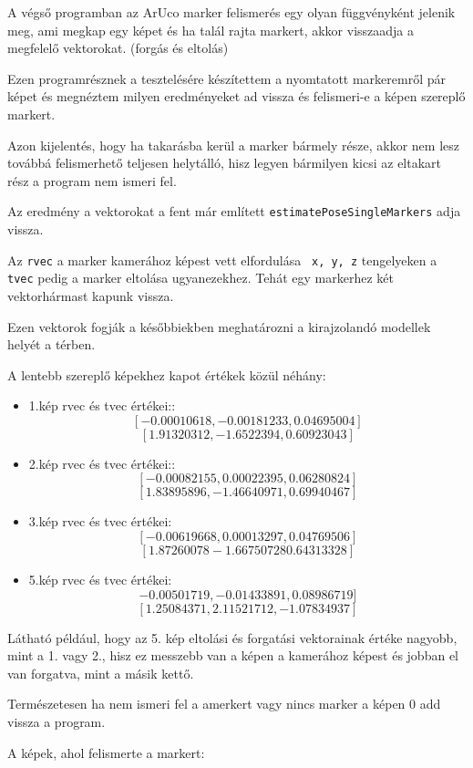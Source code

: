 
A végső programban az ArUco marker felismerés egy olyan függvényként jelenik meg, ami megkap egy képet és ha talál rajta markert, akkor visszaadja a megfelelő vektorokat. (forgás és eltolás)

Ezen programrésznek a tesztelésére készítettem a nyomtatott markeremről pár képet és megnéztem milyen eredményeket ad vissza és felismeri-e a képen szereplő markert.

Azon kijelentés, hogy ha takarásba kerül a marker bármely része, akkor nem lesz továbbá felismerhető teljesen helytálló, hisz legyen bármilyen kicsi az eltakart rész a program nem ismeri fel.

Az eredmény a vektorokat a fent már említett \texttt{estimatePoseSingleMarkers} adja vissza.

Az \texttt{rvec} a marker kamerához képest vett elfordulása \texttt{ x, y, z} tengelyeken a \texttt{tvec} pedig a marker eltolása ugyanezekhez. Tehát egy markerhez két vektorhármast kapunk vissza.

Ezen vektorok fogják a későbbiekben meghatározni a kirajzolandó modellek helyét a térben.

A lentebb szereplő képekhez kapot értékek közül néhány:
\begin{itemize}
\item 1.kép rvec és tvec értékei::
\[[-0.00010618, -0.00181233, 0.04695004]\]
\[[ 1.91320312, -1.6522394,  0.60923043]\]
\item 2.kép rvec és tvec értékei::
\[[-0.00082155,  0.00022395,  0.06280824]\]
\[[ 1.83895896, -1.46640971,  0.69940467]\]
\item 3.kép rvec és tvec értékei:
\[[-0.00619668, 0.00013297,  0.04769506]\]
\[[ 1.87260078 -1.66750728  0.64313328]\]
\item 5.kép rvec és tvec értékei:
\[-0.00501719, -0.01433891,  0.08986719]\]
\[[ 1.25084371,  2.11521712, -1.07834937]\]

\end{itemize}

Látható például, hogy az 5. kép eltolási és forgatási vektorainak értéke nagyobb, mint a 1. vagy 2., hisz ez messzebb van a képen a kamerához képest és jobban el van forgatva, mint a másik kettő.


Természetesen ha nem ismeri fel a amerkert vagy nincs marker a képen 0 add vissza a program.

A képek, ahol felismerte a markert:

